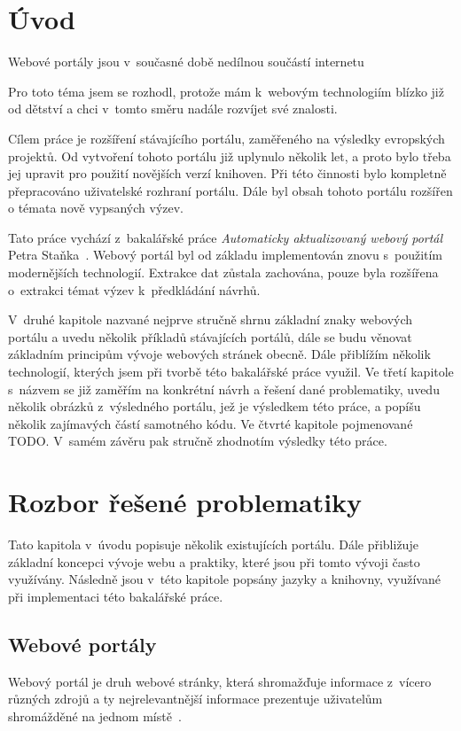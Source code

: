 \chapter{Úvod}
Webové portály jsou v~současné době nedílnou součástí internetu \blindtext

Pro toto téma jsem se rozhodl, protože mám k~webovým technologiím blízko již od dětství a chci v~tomto směru nadále rozvíjet své znalosti.

Cílem práce je rozšíření stávajícího portálu, zaměřeného na výsledky evropských projektů. Od vytvoření tohoto portálu již uplynulo několik let, a proto bylo třeba jej upravit pro použití novějších verzí knihoven. Při této činnosti bylo kompletně přepracováno uživatelské rozhraní portálu. Dále byl obsah tohoto portálu rozšířen o témata nově vypsaných výzev.

Tato práce vychází z~bakalářské práce \emph{Automaticky aktualizovaný webový portál} Petra Staňka~\cite{bib:stanek}.
Webový portál byl od základu implementován znovu s~použitím modernějších technologií. Extrakce dat zůstala zachována, pouze byla rozšířena o~extrakci témat výzev k~předkládání návrhů.

V~druhé kapitole nazvané  nejprve stručně shrnu základní znaky webových portálu a uvedu několik příkladů stávajících portálů, dále se budu věnovat základním principům vývoje webových stránek obecně. Dále přiblížím několik technologií, kterých jsem při tvorbě této bakalářské práce využil.
Ve třetí kapitole s~názvem  se již zaměřím na konkrétní návrh a řešení dané problematiky, uvedu několik obrázků z~výsledného portálu, jež je výsledkem této práce, a popíšu několik zajímavých částí samotného kódu.
Ve čtvrté kapitole pojmenované  TODO. V~samém závěru pak stručně zhodnotím výsledky této práce.




\chapter{Rozbor řešené problematiky}
Tato kapitola v~úvodu popisuje několik existujících portálu. Dále přibližuje základní koncepci vývoje webu a praktiky, které jsou při tomto vývoji často využívány. Následně jsou v~této kapitole popsány jazyky a knihovny, využívané při implementaci této bakalářské práce.

\section{Webové portály}
Webový portál je druh webové stránky, která shromažďuje informace z~vícero různých zdrojů a ty nejrelevantnější informace prezentuje uživatelům shromážděné na jednom místě~\cite{bib:portal-liferay}.

